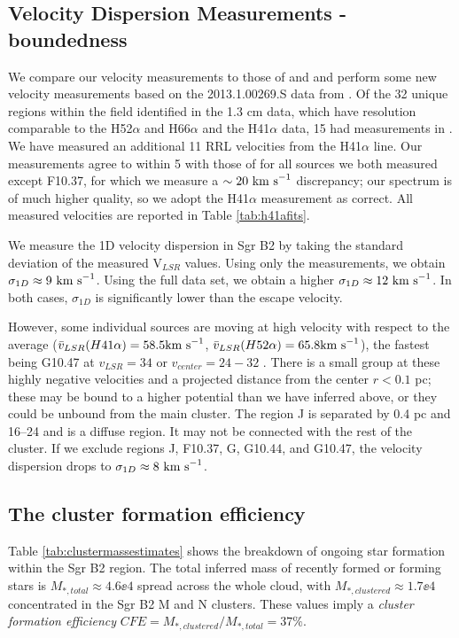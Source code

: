 \documentclass[twocolumn]{aastex61}
\begin{document}
\subsection{Velocity Dispersion Measurements - boundedness}

We compare our velocity measurements to those of \citet{De-Pree2011a} and
\citet{De-Pree1996a} and perform some new velocity measurements based on the
2013.1.00269.S data from
\citet{Ginsburg2018a}.  Of the 32 unique regions within the field
identified in the \citet{Gaume1995a} 1.3 cm data, which have resolution comparable
to the \citet{De-Pree2011a} H52$\alpha$ and H66$\alpha$ and the \citet{Ginsburg2018a}
H41$\alpha$ data, 15 had measurements in \citet{De-Pree2011a}.  We have
measured an additional 11 RRL velocities from the H41$\alpha$ line.
Our measurements agree to within 5 \kms with those of \citet{De-Pree2011a} for
all sources
we both measured except F10.37, for which we measure a $\sim20~\textrm{km~s}^{-1}$ discrepancy;
our spectrum is of much higher quality, so we adopt the H41$\alpha$ measurement
as correct.
All measured velocities are reported in Table \ref{tab:h41afits}.

We measure the 1D velocity dispersion in Sgr B2 by taking the standard deviation
of the measured V$_{LSR}$ values.
Using only the \citet{De-Pree2011a} measurements, we obtain $\sigma_{1D}\approx9~\textrm{km~s}^{-1}$.
Using the full data set, we obtain a higher $\sigma_{1D}\approx12~\textrm{km~s}^{-1}$.
In both cases, $\sigma_{1D}$ is significantly lower than the escape velocity.

However, some individual sources are moving at high velocity with respect to
the average ($\bar{v}_{LSR}(H41\alpha) = 58.5 \textrm{km~s}^{-1}$, $\bar{v}_{LSR}(H52\alpha)
= 65.8 \textrm{km~s}^{-1}$), the fastest being G10.47 at $v_{LSR}=34$ \kms or
$v_{center}=24-32$ \kms.  There is a small group at these highly negative
velocities and a projected distance from the center $r<0.1$ pc; these may be
bound to a higher potential than we have inferred above, or they could be unbound
from the main cluster.
The \hii region J is separated by 0.4 pc and 16--24 \kms and is a diffuse \hii
region.  It may not be connected with the rest of the cluster.
If we exclude regions J, F10.37, G, G10.44, and G10.47, the velocity dispersion
drops to $\sigma_{1D}\approx8~\textrm{km~s}^{-1}$.

\clearpage

\clearpage

\subsection{The cluster formation efficiency}
Table \ref{tab:clustermassestimates} shows the breakdown of ongoing star
formation within the Sgr B2 region.  The total inferred mass of recently
formed or forming stars is $M_{*,total}\approx4.6\ee{4}$ \msun spread across
the whole cloud, with $M_{*,clustered}\approx1.7\ee{4}$ \msun concentrated
in the Sgr B2 M and N clusters.  These values imply a \textit{cluster
formation efficiency} $CFE=M_{*,clustered}/M_{*,total} = 37\%$.
\end{document}

